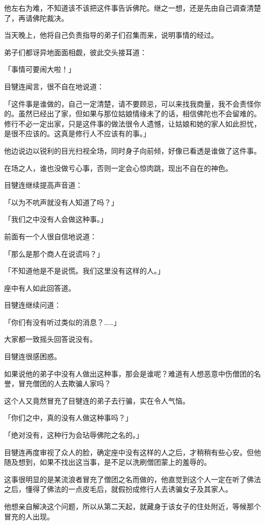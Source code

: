 \documentclass[twoside,openany]{book}
\begin{document}
他左右为难，不知道该不该把这件事告诉佛陀。继之一想，还是先由自己调查清楚了，再请佛陀裁决。

当天晚上，他将自己负责指导的弟子们召集而来，说明事情的经过。

弟子们都讶异地面面相觑，彼此交头接耳道：

「事情可要闹大啦！」

目犍连闻言，很不自在地说道：

「这件事是谁做的，自己一定清楚，请不要顾忌，可以来找我商量，我不会责怪你的。虽然已经出了家，但如果与那位姑娘情缘未了的话，相信佛陀也不会留难的。修行不必一定出家，只是这件事的做法很令人遗憾，让姑娘和她的家人如此担忧，是很不应该的。这真是修行人不应该有的事。」

他边说边以锐利的目光扫视全场，同时身子向前倾，好像已看透是谁做了这件事。

在场之人，谁也没做亏心事，否则一定会心惊肉跳，现出不自在的神色。

目犍连继续提高声音道：

「以为不吭声就没有人知道了吗？」

「我们之中没有人会做这种事。」

前面有一个人很自信地说道：

「那么是那个商人在说谎吗？」

「不知道他是不是说慌。我们这里没有这样的人。」

座中有人如此回答道。

目犍连继续问道：

「你们有没有听过类似的消息？……」

大家都一致摇头回答说没有。

目犍连很感困惑。

如果说他的弟子中没有人做出这种事，那会是谁呢？难道有人想恶意中伤僧团的名誉，冒充僧团的人去欺骗人家吗？

这个人又竟然冒充了目犍连的弟子去行骗，实在令人气恼。

「你们之中，真的没有人做这种事吗？」

「绝对没有，这种行为会玷辱佛陀之名的。」

目犍连再度审视了众人的脸，确定座中没有这样的人之后，才稍稍有些心安。但他随及想到，如果不找出这当事，是不足以洗刷僧团蒙上的羞辱的。

这事很明显的是某流浪者冒充了僧团之名而做的，他直觉到这个人一定在听了佛法之后，懂得了佛法的一点皮毛后，就假扮成修行人去诱骗女子及其家人。

他想亲自解决这个问题，所以从第二天起，就藏身于该女子的住处附近，等候那个冒充的人出现。
\end{document}
